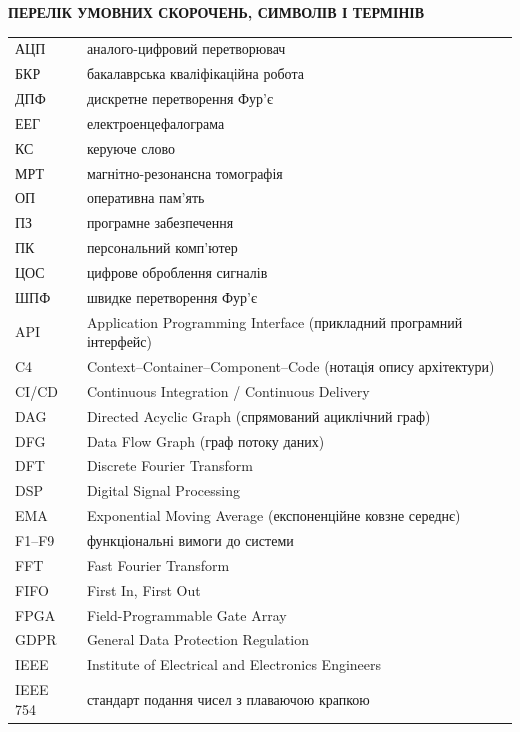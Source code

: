 {\centering\bfseries ПЕРЕЛІК УМОВНИХ СКОРОЧЕНЬ, СИМВОЛІВ І ТЕРМІНІВ\par}
\vspace{1em}

\begin{tabular}{p{2.5cm}p{11.5cm}}
  АЦП    & аналого-цифровий перетворювач \\
  БКР    & бакалаврська кваліфікаційна робота \\
  ДПФ    & дискретне перетворення Фур'є \\
  ЕЕГ    & електроенцефалограма \\
  КС     & керуюче слово \\
  МРТ    & магнітно-резонансна томографія \\
  ОП     & оперативна пам'ять \\
  ПЗ     & програмне забезпечення \\
  ПК     & персональний комп'ютер \\
  ЦОС    & цифрове оброблення сигналів \\
  ШПФ    & швидке перетворення Фур'є \\
  \hline
  API    & Application Programming Interface (прикладний програмний інтерфейс) \\
  C4     & Context--Container--Component--Code (нотація опису архітектури) \\
  CI/CD  & Continuous Integration / Continuous Delivery \\
  DAG    & Directed Acyclic Graph (спрямований ациклічний граф) \\
  DFG    & Data Flow Graph (граф потоку даних) \\
  DFT    & Discrete Fourier Transform \\
  DSP    & Digital Signal Processing \\
  EMA    & Exponential Moving Average (експоненційне ковзне середнє) \\
  F1--F9 & функціональні вимоги до системи \\
  FFT    & Fast Fourier Transform \\
  FIFO   & First In, First Out \\
  FPGA   & Field-Programmable Gate Array \\
  GDPR   & General Data Protection Regulation \\
  IEEE   & Institute of Electrical and Electronics Engineers \\
  IEEE 754 & стандарт подання чисел з плаваючою крапкою \\

\end{tabular}
